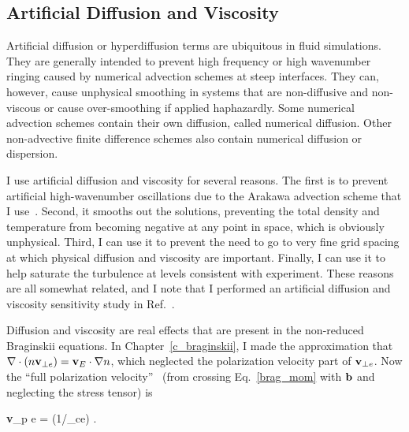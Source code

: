 \subsection{Artificial Diffusion and Viscosity}
\label{ss_art_diff}

Artificial diffusion or hyperdiffusion terms are ubiquitous in fluid simulations. They are generally intended to prevent high frequency or high wavenumber ringing caused by numerical advection
schemes at steep interfaces. They can, however, cause unphysical smoothing in systems that are non-diffusive and non-viscous or cause over-smoothing if applied haphazardly. Some numerical
advection schemes contain their own diffusion, called numerical diffusion. Other non-advective finite difference schemes also contain numerical diffusion or dispersion.

I use artificial diffusion and viscosity for several reasons. The first is to prevent artificial high-wavenumber oscillations due to the Arakawa advection scheme that I use~\cite{arakawa1966}.
Second, it smooths out the solutions, preventing the total density and temperature from becoming negative at any point in space, which is obviously unphysical. Third, I can use it
to prevent the need to go to very fine grid spacing at which physical diffusion and viscosity are important. Finally, I can use it to help saturate the turbulence at levels consistent with experiment.
These reasons are all somewhat related, and I note that I performed an artificial diffusion and viscosity sensitivity study in Ref.~\cite{friedman2012}.

Diffusion and viscosity are real effects that are present in the non-reduced Braginskii equations. In Chapter~\ref{c_braginskii}, I made the approximation that 
$\nabla \cdot (n {\bf v}_{\perp e}) = {\bf v}_{E} \cdot \nabla n$, which neglected the polarization velocity part of ${\bf v}_{\perp e}$. Now the ``full polarization velocity''~\cite{simakov2003}
(from crossing Eq.~\ref{brag_mom} with ${\bf b}$ and neglecting the stress tensor) is

\beq
\label{e_pol_v}
{\bf v}_{p e} = (1/\omega_{ce}) .
\eeq

